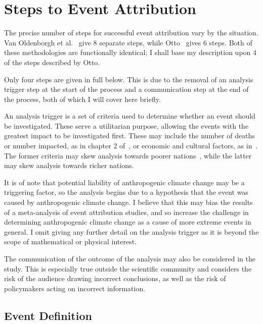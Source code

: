 \section{Steps to Event Attribution}\label{sec:attrsteps}

The precise number of steps for successful event attribution vary by the situation.
Van Oldenborgh et al.~\cite{van_Oldenborgh_et_al_2021} give 8 separate steps,
    while Otto~\cite{Otto_2017} gives 6 steps.
Both of these methodologies are functionally identical;
    I shall base my description upon 4 of the steps described by Otto.

Only four steps are given in full below.
This is due to the removal of an analysis trigger step at the start of the process
    and a communication step at the end of the process,
    both of which I will cover here briefly.

An analysis trigger is a set of criteria used to determine whether an event should be investigated.
These serve a utilitarian purpose,
    allowing the events with the greatest impact to be investigated first.
These may include the number of deaths or number impacted,
    as in chapter 2 of~\cite{van_Oldenborgh_et_al_2021},
    or economic and cultural factors, as in~\cite{Tett_Soon}.
The former criteria may skew analysis towards poorer nations~\cite{Kahn_2005},
    while the latter may skew analysis towards richer nations.

It is of note that potential liability of anthropogenic climate change may be a triggering factor,
    so the analysis begins due to a hypothesis that the event was caused by anthropogenic climate change.
I believe that this may bias the results of a meta-analysis of event attribution studies,
    and so increase the challenge in determining anthropogenic climate change as a cause of more extreme events in general.
I omit giving any further detail on the analysis trigger as it is beyond the scope of mathematical or physical interest.

The communication of the outcome of the analysis may also be considered in the study.
This is especially true outside the scientific community
    and considers the risk of the audience drawing incorrect conclusions,
    as well as the risk of policymakers acting on incorrect information.

\subsection{Event Definition}\label{subsec:backeventdef}

